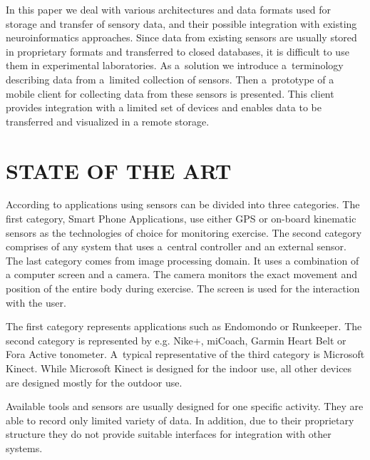 \documentclass[a4paper,twoside]{article}
\begin{document}
In this paper we deal with various architectures and data formats used for storage and transfer of sensory data, and their possible integration with existing neuroinformatics approaches. Since data from existing sensors are usually stored in proprietary formats and transferred to closed databases, it is difficult to use them in experimental laboratories. As a~solution we introduce a~terminology describing data from a~limited collection of sensors. Then a~prototype of a mobile client for collecting data from these sensors is presented. This client provides integration with a limited set of devices and enables data to be transferred and visualized in a remote storage.

\section{\uppercase{state of the art}}
\label{sec:state-of-the-art}

\noindent
According to \cite{Lowe2012242} applications using sensors can be divided into three categories. The first category, Smart Phone Applications, use either GPS or 
on-board kinematic sensors as the technologies of choice for monitoring exercise. The second category comprises of any system that uses a~central controller
and an external sensor. The last category comes from image processing domain. It uses a combination of a computer screen and a camera. The camera monitors the exact movement and position of the entire body during exercise. The screen is used for the interaction with the user.

The first category represents applications such as Endomondo or Runkeeper. The second category is represented by e.g. Nike+, miCoach, Garmin Heart Belt or Fora Active tonometer. A~typical representative of the third category is Microsoft Kinect. While Microsoft Kinect is designed for the indoor use, all other devices are designed mostly for the outdoor use.

Available tools and sensors are usually designed for one specific activity. They are able to record only limited variety of data. In addition, due to their proprietary structure they do not provide suitable interfaces for integration with other systems.
\end{document}
